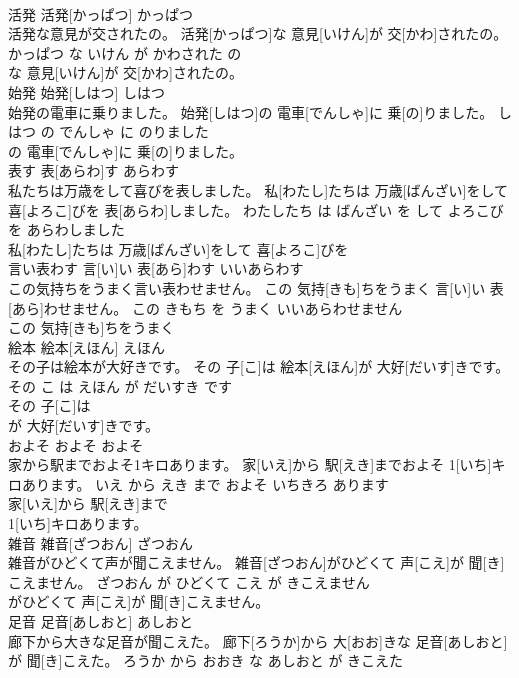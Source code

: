 \documentclass[8pt]{extreport}
\begin{document}
\begin{CJK}{UTF8}{min}
\\	活発	活発[かっぱつ]	かっぱつ	
\\	活発な意見が交されたの。	活発[かっぱつ]な 意見[いけん]が 交[かわ]されたの。	かっぱつ な いけん が かわされた の	
\\	な 意見[いけん]が 交[かわ]されたの。			
\\	始発	始発[しはつ]	しはつ	
\\	始発の電車に乗りました。	始発[しはつ]の 電車[でんしゃ]に 乗[の]りました。	しはつ の でんしゃ に のりました	
\\	の 電車[でんしゃ]に 乗[の]りました。			
\\	表す	表[あらわ]す	あらわす	
\\	私たちは万歳をして喜びを表しました。	私[わたし]たちは 万歳[ばんざい]をして 喜[よろこ]びを 表[あらわ]しました。	わたしたち は ばんざい を して よろこび を あらわしました	
\\	私[わたし]たちは 万歳[ばんざい]をして 喜[よろこ]びを
\\	言い表わす	言[い]い 表[あら]わす	いいあらわす	
\\	この気持ちをうまく言い表わせません。	この 気持[きも]ちをうまく 言[い]い 表[あら]わせません。	この きもち を うまく いいあらわせません	
\\	この 気持[きも]ちをうまく
\\	絵本	絵本[えほん]	えほん	
\\	その子は絵本が大好きです。	その 子[こ]は 絵本[えほん]が 大好[だいす]きです。	その こ は えほん が だいすき です	
\\	その 子[こ]は
\\	が 大好[だいす]きです。			
\\	およそ	およそ	およそ	
\\	家から駅までおよそ1キロあります。	家[いえ]から 駅[えき]までおよそ 1[いち]キロあります。	いえ から えき まで およそ いちきろ あります	
\\	家[いえ]から 駅[えき]まで
\\	1[いち]キロあります。			
\\	雑音	雑音[ざつおん]	ざつおん	
\\	雑音がひどくて声が聞こえません。	雑音[ざつおん]がひどくて 声[こえ]が 聞[き]こえません。	ざつおん が ひどくて こえ が きこえません	
\\	がひどくて 声[こえ]が 聞[き]こえません。			
\\	足音	足音[あしおと]	あしおと	
\\	廊下から大きな足音が聞こえた。	廊下[ろうか]から 大[おお]きな 足音[あしおと]が 聞[き]こえた。	ろうか から おおき な あしおと が きこえた	

\end{CJK}
\end{document}
